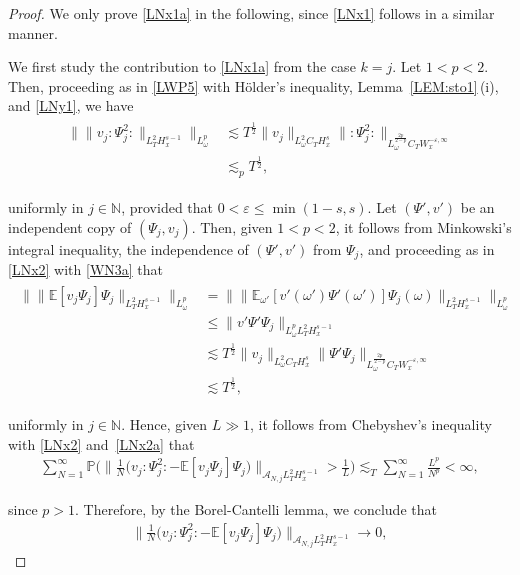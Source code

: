 \documentclass[letterpaper, 11pt,  reqno]{amsart}
\newcommand{\1}{\hspace{0.5mm}\text{I}\hspace{0.2mm}}
\newcommand{\noi}{\noindent}
\newcommand{\N}{\mathbb{N}}
\newcommand{\E}{\mathbb{E}}
\newcommand{\PP}{\mathbb{P}}
\newcommand{\eps}{\varepsilon}
\newcommand{\les}{\lesssim}
\newcommand{\A}{\mathcal{A}}
\newcommand{\wick}[1]{:\!{#1}\!:}
\newcommand{\too}{\longrightarrow}
\renewcommand{\o}{\omega}
\numberwithin{equation}{section}
\numberwithin{theorem}{section}
\begin{document}
\begin{proof}
We only prove \eqref{LNx1a} in the following, since  \eqref{LNx1} 
follows in a similar manner.

We first study the contribution to \eqref{LNx1a} from  the case $k = j$.
Let $1 < p < 2$.
Then, 
proceeding as in  \eqref{LWP5}
with H\"older's inequality, 
 Lemma~\ref{LEM:sto1}\,(i), and \eqref{LNy1}, we have 
\begin{align}
\begin{split}
\Big\| \| v_j \! \wick{\Psi_j^2} \|_{L_T^2 H_x^{s-1}} \Big\|_{L^p_\o}
&\les T^\frac 12  \| v_j \|_{L^2_\o C_T  H_x^{s}}
 \| \wick{\Psi_j^2} \|_{L^\frac{2p}{2-p}_\o C_T  W_x^{- \eps, \infty}}\\
 & \les_p 
  T^\frac 12, 
\end{split}
\label{LNx2}
\end{align}

\noi
uniformly in $j \in \N$, 
provided that $0 < \eps \le \min(1-s,  s)$.
Let $(\Psi', v')$ be an independent copy of $(\Psi_j, v_j)$.
Then, given $1 < p < 2$, 
it follows from 
Minkowski's integral inequality, 
the independence of $(\Psi', v')$ from $\Psi_j$, 
and proceeding as in \eqref{LNx2} 
with \eqref{WN3a} that 
\begin{align}
\begin{split}
 \Big\| \| \E [ v_j \Psi_j ] \Psi_j \|_{L_T^2 H_x^{s-1}} \Big\|_{L^p_\o}
& = \Big\| \| \E_{\o'} [ v' (\o')  \Psi' (\o')] \Psi_j  (\o)\|_{L_T^2 H_x^{s-1}}\Big\|_{L^p_\o}\\
& \le
 \| v'  \Psi'   \Psi_j  \|_{L^p_\o L_T^2 H_x^{s-1}} \\
&\les T^\frac 12  \| v_j \|_{L^2_\o C_T  H_x^s}
 \|\Psi' \Psi_j  \|_{L^\frac {2p}{2-p}_\o C_T  W_x^{- \eps, \infty}}\\
 & \les 
  T^\frac 12, 
\end{split}
\label{LNx2a}
\end{align}

\noi
uniformly in $j \in \N$.
Hence, 
given $L \gg1$, it follows
from Chebyshev's inequality with \eqref{LNx2} and~\eqref{LNx2a}
that 
\begin{align}
 \sum_{N = 1}^\infty \PP 
\Bigg(\bigg\| \frac 1N  \Big(v_j \wick{\Psi_j^2} - \E [v_j  \Psi_j ] \Psi_j\Big)
\bigg\|_{\A_{N, j}L_T^2 H_x^{s-1}} > \frac 1 L \Bigg)
\les_T \sum_{N = 1}^\infty \frac {L^p}{N^p}
 < \infty, 
\label{LNx2b}
\end{align}

\noi
since $p > 1$.
Therefore, by the Borel-Cantelli lemma, we conclude that 
\begin{align*}
\bigg\| \frac 1N  \Big(v_j \wick{\Psi_j^2} - \E [ v_j \Psi_j] \Psi_j\Big)
\bigg\|_{\A_{N, j}L_T^2 H_x^{s-1}} 
\too 0, 
\end{align*}


\end{proof}
\end{document}
